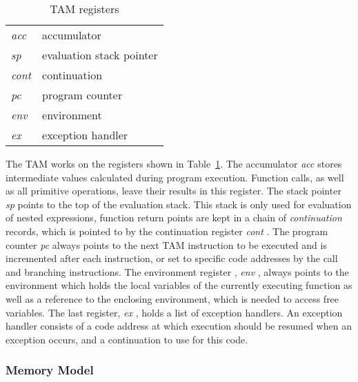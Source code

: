 \begin{table}
\begin{center}
\begin{tabular}{|ll|}
\hline
{\em acc} & accumulator\\
{\em sp} & evaluation stack pointer\\
{\em cont} & continuation\\
{\em pc} & program counter\\
{\em env} & environment\\
{\em ex} & exception handler\\
\hline
\end{tabular}
\end{center}
\caption{TAM registers}
\label{tab:tam-registers}
\end{table}

The TAM works on the registers shown in Table~\ref{tab:tam-registers}.
The accumulator {\em acc} stores intermediate values calculated during
program execution.  Function calls, as well as all primitive
operations, leave their results in this register.  The stack pointer
{\em sp} points to the top of the evaluation stack.  This stack is
only used for evaluation of nested expressions, function return points
are kept in a chain of {\em continuation}%
%
%
 records, which is pointed to
by the continuation register%
%
 {\em cont}%
.  The program counter%
 {\em pc}%
always points to the next TAM instruction to be executed and is
incremented after each instruction, or set to specific code addresses
by the call and branching instructions.  The environment register%
, {\em env}%
, always points to the environment
which holds the local variables of the currently executing function as
well as a reference to the enclosing environment, which is needed to
access free variables.  The
last register, {\em ex}%
, holds a list of exception handlers.  An
exception handler consists of a code address at which execution should
be resumed when an exception occurs, and a continuation to use for
this code.


\subsubsection{Memory Model}

